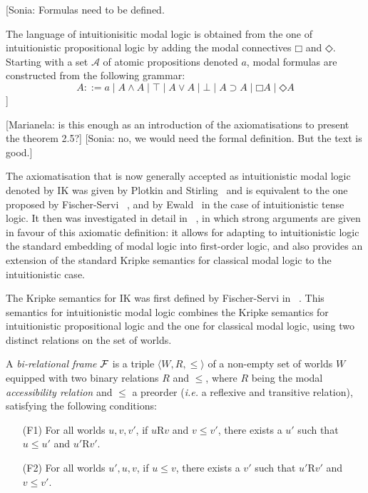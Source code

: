 \documentclass[twoside]{aiml18}
\newcommand{\marianela}[1]{{\color{purple}[Marianela: #1]}}
\newcommand{\sonia}[1]{{\color{blue}[Sonia: #1]}}
\newcommand*{\NOT}{\neg}
\newcommand*{\AND}{\mathbin{\wedge}}
\newcommand*{\TOP}{\mathord{\top}}
\newcommand*{\OR}{\mathbin{\vee}}
\newcommand*{\BOT}{\mathord{\bot}}
\newcommand*{\IMP}{\mathbin{\supset}}
\newcommand*{\BOX}{\mathord{\Box}}
\newcommand*{\DIA}{\mathord{\Diamond}}
\begin{document}
\sonia{Formulas need to be defined.
	
	The language of {intuitionisitic modal logic} is obtained from the one of intuitionistic propositional logic by adding the modal connectives $\BOX$ and $\DIA$. %
	Starting with a set $\mathcal{A}$ of atomic propositions denoted $a$, modal formulas are constructed from the following grammar:
	$$
	A  ::=
	a \mid A \AND A \mid \TOP \mid A \OR A \mid \BOT \mid A \IMP A \mid \BOX A \mid \DIA A
	$$
}

\marianela{is this enough as an introduction of the axiomatisations to present the theorem 2.5?}
\sonia{no, we would need the formal definition. But the text is good.}

The axiomatisation that is now generally accepted as intuitionistic modal logic denoted by IK was given by Plotkin and Stirling~\cite{Plotkin} and is equivalent to the one proposed by Fischer-Servi ~\cite{Fischer}, and by Ewald~\cite{Ewald} in the case of intuitionistic tense logic. 
%
It then was investigated in detail in ~\cite{Simpson}, in which strong arguments are given in favour of this axiomatic definition: 
%
it allows for adapting to intuitionistic logic the standard embedding of modal logic into first-order logic, and also provides an extension of the standard Kripke semantics for classical modal logic to the intuitionistic case.


The Kripke semantics for IK was first defined by Fischer-Servi in ~\cite{Fischer}.
%
This semantics for intuitionistic modal logic combines the Kripke semantics for intuitionistic propositional logic and the one for classical modal logic, using two distinct relations on the set of worlds.

\begin{definition}
	A \emph{bi-relational frame} $\mathcal{F}$ is a triple $\langle W, R, \le \rangle$ of a non-empty set of worlds $W$ equipped with two binary relations $R$ and $\le$, where $R$ being the modal \emph{accessibility relation} and $\le$ a preorder (\emph{i.e.} a reflexive and transitive relation), satisfying the following conditions:
	\begin{itemize}
		\item[(F1)] For all worlds $u, v, v'$, if $u$R$v$ and $v \le v'$, there exists a $u'$ such that $u \le u'$ and $u'$R$v'$.
		
		\item[(F2)] For all worlds $u', u, v$, if $u \le v$, there exists a $v'$ such that $u'$R$v'$ and $v\le v'$.
	\end{itemize}
	
\end{definition}
\end{document}
